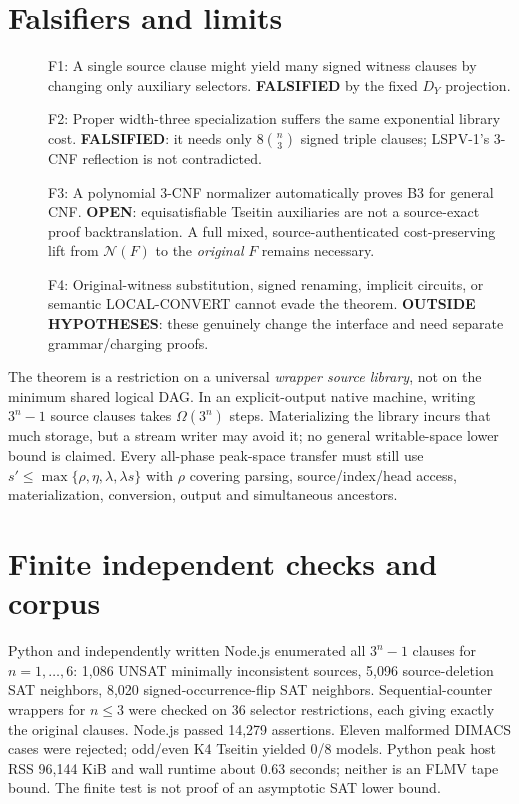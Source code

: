 \documentclass[11pt]{article}
\begin{document}
\section*{Falsifiers and limits}
\begin{description}
\item[] F1: A single source clause might yield many signed witness clauses by changing only auxiliary selectors. \textbf{FALSIFIED} by the fixed $D_Y$ projection.
\item[] F2: Proper width-three specialization suffers the same exponential library cost. \textbf{FALSIFIED}: it needs only $8\binom n3$ signed triple clauses; LSPV-1's 3-CNF reflection is not contradicted.
\item[] F3: A polynomial 3-CNF normalizer automatically proves B3 for general CNF. \textbf{OPEN}: equisatisfiable Tseitin auxiliaries are not a source-exact proof backtranslation. A full mixed, source-authenticated cost-preserving lift from $\mathcal N(F)$ to the \emph{original} $F$ remains necessary.
\item[] F4: Original-witness substitution, signed renaming, implicit circuits, or semantic LOCAL-CONVERT cannot evade the theorem. \textbf{OUTSIDE HYPOTHESES}: these genuinely change the interface and need separate grammar/charging proofs.
\end{description}
The theorem is a restriction on a universal \emph{wrapper source library}, not on the minimum shared logical DAG. In an explicit-output native machine, writing $3^n-1$ source clauses takes $\Omega(3^n)$ steps. Materializing the library incurs that much storage, but a stream writer may avoid it; no general writable-space lower bound is claimed. Every all-phase peak-space transfer must still use $s'\le\max\{\rho,\eta,\lambda,\lambda s\}$ with $\rho$ covering parsing, source/index/head access, materialization, conversion, output and simultaneous ancestors.

\section*{Finite independent checks and corpus}
Python and independently written Node.js enumerated all $3^n-1$ clauses for $n=1,\ldots,6$: 1,086 UNSAT minimally inconsistent sources, 5,096 source-deletion SAT neighbors, 8,020 signed-occurrence-flip SAT neighbors. Sequential-counter wrappers for $n\le3$ were checked on 36 selector restrictions, each giving exactly the original clauses. Node.js passed 14,279 assertions. Eleven malformed DIMACS cases were rejected; odd/even K4 Tseitin yielded 0/8 models. Python peak host RSS 96,144 KiB and wall runtime about 0.63 seconds; neither is an FLMV tape bound. The finite test is not proof of an asymptotic SAT lower bound.
\end{document}
